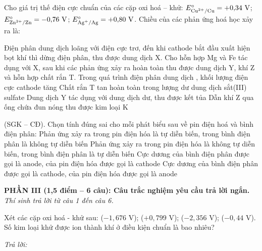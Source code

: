 \documentclass[11pt,a4paper]{article}
\def\loigiai#1{}
\begin{document}
\begin{ex}
Cho giá trị thế điện cực chuẩn của các cặp oxi hoá – khử: $E^\circ_{\ce{Cu^2+/Cu}} = +0{,}34\text{ V}$; $E^\circ_{\ce{Zn^2+/Zn}} = -0{,}76\text{ V}$; $E^\circ_{\ce{Ag+/Ag}} = +0{,}80\text{ V}$. Chiều của các phản ứng hoá học xảy ra là:
\choiceTF
{}
{}
{}
{}
\loigiai{}
\end{ex}

\begin{ex}
Điện phân dung dịch  loãng với điện cực trơ, đến khi cathode bắt đầu xuất hiện bọt khí thì dừng điện phân, thu được dung dịch X. Cho hỗn hợp Mg và Fe tác dụng với X, sau khi các phản ứng xảy ra hoàn toàn thu được dung dịch Y, khí Z và hỗn hợp chất rắn T.
\choiceTF
{Trong quá trình điện phân dung dịch , khối lượng điện cực cathode tăng}
{Chất rắn T tan hoàn toàn trong lượng dư dung dịch sắt(III) sulfate}
{Dung dịch Y tác dụng với dung dịch  dư, thu được kết tủa}
{Dẫn khí Z qua ống chứa  đun nóng thu được kim loại K}
\loigiai{}
\end{ex}

\begin{ex}
(SGK – CĐ). Chọn tính đúng sai cho mỗi phát biểu sau về pin điện hoá và bình điện phân:
\choiceTF
{Phản ứng xảy ra trong pin điện hóa là tự diễn biến, trong bình điện phân là không tự diễn biến}
{Phản ứng xảy ra trong pin điện hóa là không tự diễn biến, trong bình điện phân là tự diễn biến}
{Cực dương của bình điện phân được gọi là anode, của pin điện hóa được gọi là cathode}
{Cực dương của bình điện phân được gọi là cathode, của pin điện hóa được gọi là anode}
\loigiai{}
\end{ex}

\newpage

\noindent
\textbf{PHẦN III (1,5 điểm -- 6 câu): Câu trắc nghiệm yêu cầu trả lời ngắn.}\\
\textit{Thí sinh trả lời từ câu 1 đến câu 6.}

\setcounter{ex}{0}

\begin{ex}
Xét các cặp oxi hoá - khử sau:  ($-1{,}676\text{ V}$);  ($+0{,}799\text{ V}$);  ($-2{,}356\text{ V}$);  ($-0{,}44\text{ V}$). Số kim loại khử được ion  thành khí  ở điều kiện chuẩn là bao nhiêu?
\par\noindent\textit{Trả lời:} \dotfill
\loigiai{}
\end{ex}
\end{document}
